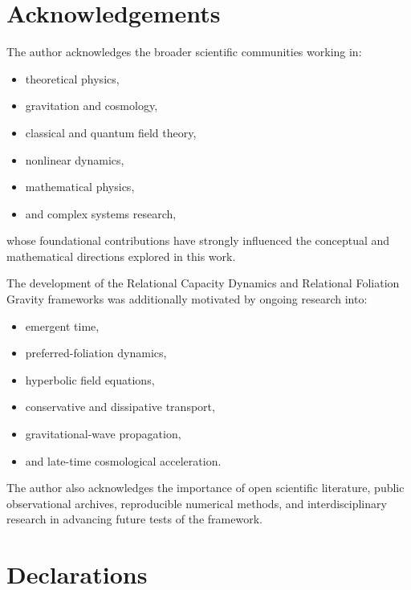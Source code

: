 \documentclass[11pt,a4paper]{article}
\begin{document}

\section*{Acknowledgements}

The author acknowledges the broader scientific communities working in:

\begin{itemize}
    \item theoretical physics,
    \item gravitation and cosmology,
    \item classical and quantum field theory,
    \item nonlinear dynamics,
    \item mathematical physics,
    \item and complex systems research,
\end{itemize}

whose foundational contributions have strongly influenced the conceptual and
mathematical directions explored in this work.

The development of the Relational Capacity Dynamics and Relational Foliation
Gravity frameworks was additionally motivated by ongoing research into:

\begin{itemize}
    \item emergent time,
    \item preferred-foliation dynamics,
    \item hyperbolic field equations,
    \item conservative and dissipative transport,
    \item gravitational-wave propagation,
    \item and late-time cosmological acceleration.
\end{itemize}

The author also acknowledges the importance of open scientific literature,
public observational archives, reproducible numerical methods, and
interdisciplinary research in advancing future tests of the framework.

\section*{Declarations}
\end{document}
